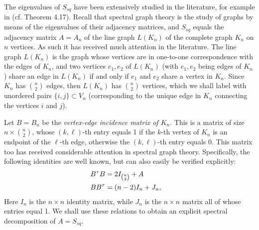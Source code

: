 \documentclass[12pt]{amsart}
\numberwithin{theorem}{section}
\theoremstyle{remark}
\begin{document}
The eigenvalues of $S_{sq}$ have been extensively studied in the literature, for example  in \cite{Cvetkovic2} (cf. Theorem 4.17). Recall that spectral graph theory is the study of graphs by means of the eigenvalues of their adjacency matrices, and $S_{sq}$ equals the adjacency matrix $A = A_n$ of the line graph $L(K_n)$ of the complete graph $K_n$ on $n$ vertices. As such it has received much attention in the literature. 
The line graph $L(K_n)$ is the graph whose vertices are in one-to-one correspondence with the edges of $K_n$, and two vertices $e_1, e_2$ of $L(K_n)$ (with $e_1, e_2$ being edges of $K_n$) share an edge in $L(K_n)$ if and only if $e_1$ and $e_2$ share a vertex in $K_n$. Since $K_n$ has ${n\choose 2}$ edges, then $L(K_n)$ has ${n\choose 2}$ vertices, which we shall label with unordered pairs $\{i,j\}\subset V_n$ (corresponding to the unique edge in $K_n$ connecting the vertices $i$ and $j$). 

Let $B=B_n$ be the {\em vertex-edge incidence matrix of $K_n$}. This is a matrix of size $n\times {n\choose 2}$, whose $(k,\ell)$-th entry equals 1 if the $k$-th vertex of $K_n$ is an endpoint of the $\ell$-th edge, otherwise the $(k,\ell)$-th entry equals 0. This matrix too has received considerable attention in spectral graph theory. Specifically, the following identities are well known, but can also easily be verified explicitly:
%
\begin{align} \label{Equations for the edge-vertex matrix B}
B^\tau B & = 2I_{n\choose 2} + A \cr %
B B^\tau  & = (n-2)I_n + J_n,
\end{align}
%
Here $I_n$ is the $n\times n$ identity matrix, while $J_n$ is the $n\times n$ matrix all of whose entries equal 1. We shall use these relations to obtain an explicit spectral decomposition of $A=S_{sq}$. 
\end{document}
